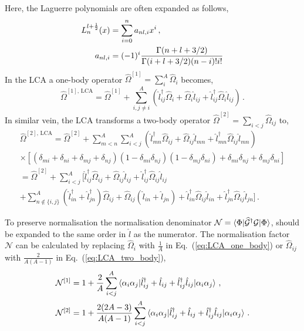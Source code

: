 \documentclass[10pt]{article}
\begin{document}
Here, the Laguerre polynomials are often expanded as follows,
\begin{align}
	L_{n}^{l+\frac{1}{2}}(x) &= \sum_{i=0}^{n} a_{nl,i} x^{i} \, , \notag \\
	a_{nl,i} &= (-1)^{i} \frac{ \Gamma(n+l+3/2) }{ \Gamma(i+l+3/2)(n-i)! i!}
	\label{eq:def:laguerre_exp}
\end{align}
In the LCA a one-body operator $\widehat{\Omega}^{[1]} = \sum_{i}^{A} \widehat{\Omega}_{i}$ becomes,
\begin{equation}
	\widehat{\Omega}^{[1],\,\text{LCA}} = \widehat{\Omega}^{[1]} + \sum_{i,j \neq i}^{A} \left( \hat{l}_{ij}^{\dagger} \widehat{\Omega}_{i} +  \widehat{\Omega}_{i} \hat{l}_{ij} + \hat{l}_{ij}^{\dagger}  \widehat{\Omega}_{i} \hat{l}_{ij} \right) \, .
	\label{eq:LCA_one_body}
\end{equation}
In similar vein, the LCA transforms a two-body operator $\widehat{\Omega}^{[2]} = \sum_{i<j} \widehat{\Omega}_{ij}$ to,
\begin{multline}
	\widehat{\Omega}^{[2],\,\text{LCA}} = 
	\widehat{\Omega}^{[2]}
	+ \sum_{m<n}^{A} \sum_{i<j}^{A} \left(
		\hat{l}_{mn}^{\dagger} \widehat{\Omega}_{ij} +
		\widehat{\Omega}_{ij} \hat{l}_{mn} +
		\hat{l}_{mn}^{\dagger} \widehat{\Omega}_{ij} \hat{l}_{mn}
	\right) \\ 
	\times \left[ ( \delta_{mi} + \delta_{ni} + \delta_{mj} + \delta_{nj} ) ( 1 - \delta_{mi} \delta_{nj})( 1 - \delta_{mj} \delta_{ni}) + \delta_{mi} \delta_{nj} + \delta_{mj} \delta_{ni} \right] \\
	= \widehat{\Omega}^{[2]} + 
	\sum_{i<j}^{A} \Big[ 
	\hat{l}_{ij}^{\dagger} \widehat{\Omega}_{ij} +
	\widehat{\Omega}_{ij} \hat{l}_{ij} +
	\hat{l}_{ij}^{\dagger} \widehat{\Omega}_{ij} \hat{l}_{ij} \\
	+ \sum_{n \notin \{i,j\}}^{A} 
	(\hat{l}_{in}^{\dagger} + \hat{l}_{jn}^{\dagger} ) \widehat{\Omega}_{ij} +
	\widehat{\Omega}_{ij} (\hat{l}_{in} + \hat{l}_{jn}) + 
	\hat{l}_{in}^{\dagger} \widehat{\Omega}_{ij} \hat{l}_{in} + \hat{l}_{jn}^{\dagger} \widehat{\Omega}_{ij} \hat{l}_{jn} 
	 \Big] \, .
	 \label{eq:LCA_two_body}
\end{multline} 

To preserve normalisation the normalisation denominator $ \mathcal{N} = 
\braket{ \Phi | \widehat{\mathcal{G}}{^\dagger} \mathcal{G} | \Phi }$, should be 
expanded to the same order in $\hat{l}$ as the numerator. The normalisation 
factor $\mathcal{N}$ can be calculated by replacing $\widehat{\Omega}_i$ with 
$\frac{1}{A}$ in Eq.~(\ref{eq:LCA_one_body}) or $\widehat{\Omega}_{ij}$ with 
$\frac{2}{A(A-1)}$ in Eq.~(\ref{eq:LCA_two_body}),
\begin{align}
	\mathcal{N}^{[1]} &=  1 + \frac{2}{A} \sum_{i < j}^{A} \braket{ \alpha_{i} \alpha_{j} | \hat{l}^{\dagger}_{ij} + \hat{l}_{ij} + \hat{l}^{\dagger}_{ij} \hat{l}_{ij} | \alpha_{i} \alpha_{j}}  \, ,
	\label{eq:LCA_norm_one_body}	
	\\
	\mathcal{N}^{[2]} &=  1 + \frac{2(2A-3)}{A(A-1)} \sum_{i < j}^{A} \braket{ \alpha_{i} \alpha_{j} | \hat{l}^{\dagger}_{ij} + \hat{l}_{ij} + \hat{l}^{\dagger}_{ij} \hat{l}_{ij} | \alpha_{i} \alpha_{j}} \, .
	\label{eq:LCA_norm_two_body}
\end{align}
\end{document}
